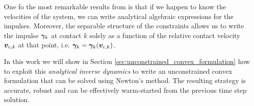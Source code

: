 One fo the most remarkable results from \cite{bib:todorov2014} is that if we
 happen to know the velocities of the system, we can write analytical algebraic
 expressions for the impulses. Moreover, the separable structure of the
 constraints allows us to write the impulse ${\bm\gamma}_k$ at contact $k$ solely as
 a function of the relative contact velocity ${\bm{v}}_{c,k}$ at that point, i.e.
 ${\bm\gamma}_k = {\bm\gamma}_k({\bm{v}}_{c,k})$.

In this work we will show in Section \ref{sec:unconstrained_convex_formulation}
how to exploit this \textit{analytical inverse dynamics} to write an
unconstrained convex formulation that can be solved using Newton's method. The
resulting strategy is accurate, robust and can be effectively warm-started from
the previous time step solution.
